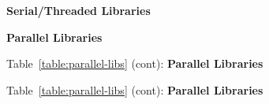 \begin{table}[h!]
\caption{\bf Serial/Threaded Libraries} \vspace*{\captionSpace{}} \label{table:serial-libs}

\vspace*{\tabSpaceBot{}}
\end{table}

\begin{table}[h!]
\caption{\bf Parallel Libraries} \vspace*{\captionSpace{}} \label{table:parallel-libs}

\vspace*{\tabSpaceBot{}}
\end{table}

\begin{table}[h!]
\caption*{Table~\ref{table:parallel-libs} (cont): {\bf Parallel Libraries} \vspace*{\captionSpace{}} }

\vspace*{\tabSpaceBot{}}
\end{table}

\begin{table}[h!]
\caption*{Table~\ref{table:parallel-libs} (cont): {\bf Parallel Libraries} \vspace*{\captionSpace{}} }

\vspace*{\tabSpaceBot{}}
\end{table}
